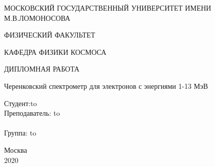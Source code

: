 \begin{titlepage}
	\fontsize{14}{20pt}\selectfont
	\newpage
	
	\begin{center}
		МОСКОВСКИЙ ГОСУДАРСТВЕННЫЙ УНИВЕРСИТЕТ ИМЕНИ М.В.ЛОМОНОСОВА
	\end{center}
	\vspace{2em}
	
	\begin{center}
ФИЗИЧЕСКИЙ ФАКУЛЬТЕТ
	\end{center}
	\vspace{1em}
	\begin{center}
		КАФЕДРА ФИЗИКИ КОСМОСА
	\end{center}
	\vspace{2em}
	
	\begin{center}
ДИПЛОМНАЯ РАБОТА
	\end{center}
		
	\vspace{2em}
	\begin{center}
		Черенковский спектрометр для электронов с энергиями 1-13 МэВ
	\end{center}
	\vspace{8em}
	
	\newbox{\lbox}
	\newlength{\maxl}
	\setlength{\maxl}{\wd\lbox plus 1ex}
	\hfill\parbox{11cm}{
		\hspace*{2cm}\hspace*{-4cm}Студент:\hfill\hbox to\\
		\hspace*{2cm}\hspace*{-4cm}Преподаватель: \hfill\hbox to\\
		\\
		\hspace*{2cm}\hspace*{-4cm}Группа: \hfill\hbox to\\
	}
	\vspace{\fill}
	
	\begin{center}
		Москва \\2020
	\end{center}
	
	
\end{titlepage}